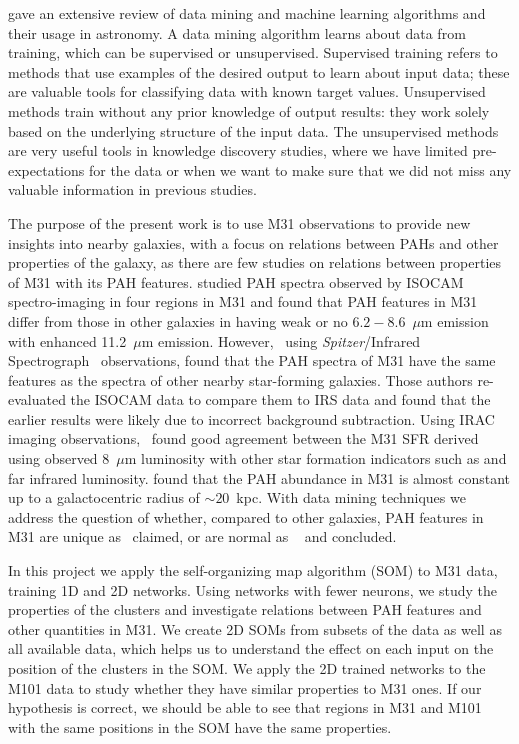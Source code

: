 \cite{Ball10} gave an extensive review of data mining and machine learning algorithms and their usage in astronomy.
A data mining algorithm learns about data from training, which can be supervised or unsupervised.
Supervised training refers to methods that use examples of the desired output to learn about input data; these are valuable tools for classifying data with known target values.
Unsupervised methods train without any prior knowledge of output results: 
they work solely based on the underlying structure of the input data.   
The unsupervised methods are very useful tools in knowledge discovery studies, where we have limited pre-expectations for the data or when we want to make sure that we did not miss any valuable information in previous studies.

The purpose of the present work is to use M31 observations to provide new insights into nearby galaxies, with a focus on relations between PAHs and other properties of the galaxy,
as there are few studies on relations between properties of M31 with its PAH features.
\cite{Cesarsky98} studied PAH spectra observed by ISOCAM spectro-imaging in four regions in M31 and found that PAH features in M31 differ from those in other galaxies in having weak or no $6.2 - 8.6$~$\mu$m emission with enhanced 11.2~$\mu$m emission. 
However,~\cite{Dim15} using {\it Spitzer}/Infrared Spectrograph~\citep[IRS;][]{Houck04b} observations, found that the PAH spectra of M31 have the same features as the spectra of other nearby star-forming galaxies.
Those authors re-evaluated the ISOCAM data to compare them to IRS data and found that the earlier results were likely due to incorrect background subtraction.
Using IRAC imaging observations,~\cite{Barmby06} found good agreement between the M31 SFR derived using observed 8~$\mu$m luminosity with other 
star formation indicators such as \halpha and far infrared luminosity.
\cite{Draine14} found that the PAH abundance in M31 is almost constant up to a galactocentric radius of $\sim 20$~kpc.
With data mining techniques we address the question of whether,
compared to other galaxies, PAH features in M31 are unique as~\cite{Cesarsky98} claimed, or  are normal as ~\cite{Dim15} and \cite{Draine14} concluded.


In this project we apply the self-organizing map algorithm (SOM) to M31 data, training 1D and 2D networks.
Using networks with fewer neurons, we study the properties of the clusters and investigate relations between PAH features and other quantities in M31.
We create 2D SOMs from subsets of the data as well as all available data, which helps us to understand the effect on each input on the position of the clusters in the SOM.
We apply the 2D trained networks to the M101 data to study whether they have similar properties to M31 ones.
If our hypothesis is correct, we should be able to see that regions in M31 and M101 with the same positions in the SOM have the same properties.


